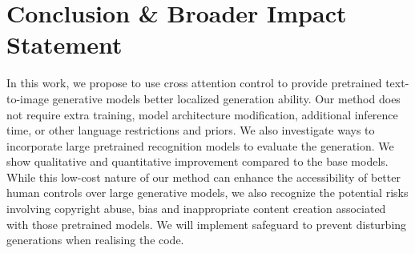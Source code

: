 \section{Conclusion \& Broader Impact Statement}
In this work, we propose to use cross attention control to provide pretrained text-to-image generative models better localized generation ability. Our method does not require extra training, model architecture modification, additional inference time, or other language restrictions and priors. We also investigate ways to incorporate large pretrained recognition models to evaluate the generation. We show qualitative and quantitative improvement compared to the base models. While this low-cost nature of our method can enhance the accessibility of better human controls over large generative models, we also recognize the potential risks involving copyright abuse, bias and inappropriate content creation associated with those pretrained models. We will implement safeguard to prevent disturbing generations when realising the code. 
